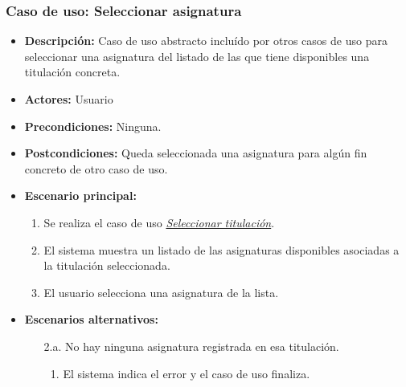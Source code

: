 \documentclass{book}
\begin{document}
\subsubsection*{Caso de uso: Seleccionar asignatura}
\label{select_asignatura}
\begin{itemize}
\item{\bf Descripción:} Caso de uso abstracto incluído por otros casos de uso para seleccionar una asignatura del listado de las que tiene disponibles una titulación concreta.
\item{\bf Actores:} Usuario
\item{\bf Precondiciones:} Ninguna.
\item{\bf Postcondiciones:} Queda seleccionada una asignatura para algún fin concreto de otro caso de uso.
\item{\bf Escenario principal:}
	\begin{enumerate}
	\item Se realiza el caso de uso {\em\hyperref[select_titulacion]{Seleccionar titulación}}.
	\item El sistema muestra un listado de las asignaturas disponibles asociadas a la titulación seleccionada.
	\item El usuario selecciona una asignatura de la lista.
	\end{enumerate}
\item{\bf Escenarios alternativos:}
	\begin{itemize}
		\item[2.a.] No hay ninguna asignatura registrada en esa titulación.
		\begin{enumerate}
			\item El sistema indica el error y el caso de uso finaliza.
		\end{enumerate}
	\end{itemize}
\end{itemize}
\end{document}
